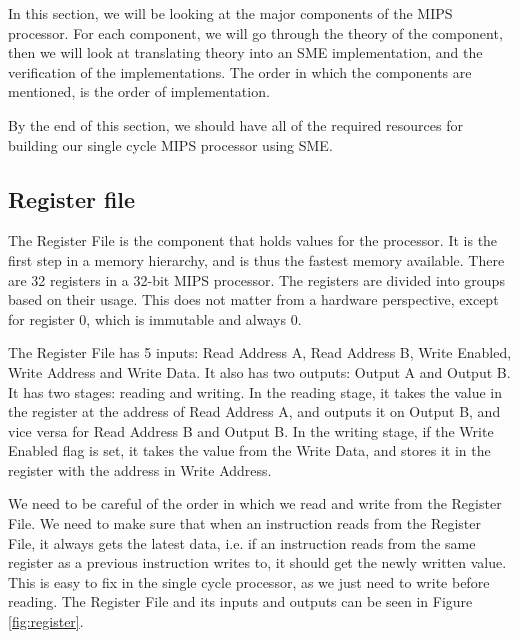 In this section, we will be looking at the major components of the MIPS
processor. For each component, we will go through the theory of the component,
then we will look at translating theory into an SME implementation, and the
verification of the implementations. The order in which the components are
mentioned, is the order of implementation.

By the end of this section, we should have all of the required resources for
building our single cycle MIPS processor using SME.

\subsection{Register file}
The Register File is the component that holds values for the processor. It is
the first step in a memory hierarchy, and is thus the fastest memory available.
There are 32 registers in a 32-bit MIPS processor. The registers are divided
into groups based on their usage. This does not matter from a hardware
perspective, except for register 0, which is immutable and always 0.

The Register File has 5 inputs: Read Address A, Read Address B, Write Enabled,
Write Address and Write Data. It also has two outputs: Output A and Output B.
It has two stages: reading and writing. In the reading stage, it takes the
value in the register at the address of Read Address A, and outputs it on
Output B, and vice versa for Read Address B and Output B. In the writing stage,
if the Write Enabled flag is set, it takes the value from the Write Data, and
stores it in the register with the address in Write Address.

We need to be careful of the order in which we read and write from the Register
File. We need to make sure that when an instruction reads from the Register
File, it always gets the latest data, i.e. if an instruction reads from the
same register as a previous instruction writes to, it should get the newly
written value. This is easy to fix in the single cycle processor, as we just
need to write before reading. The Register File and its inputs and outputs can
be seen in Figure \ref{fig:register}.


